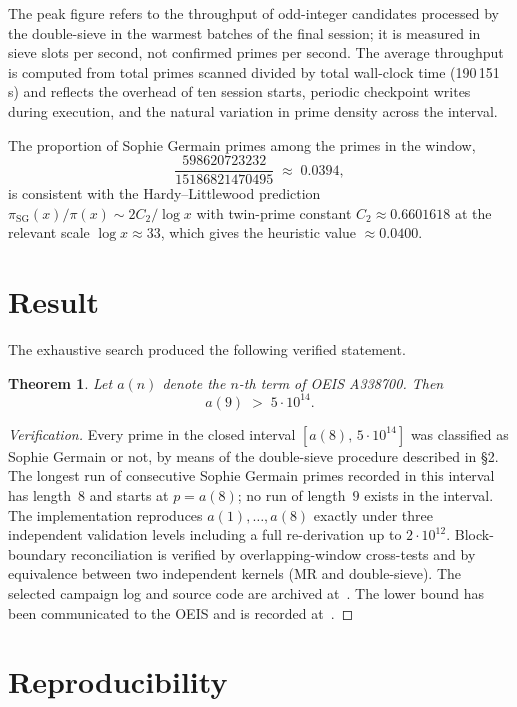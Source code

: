 \documentclass[11pt,a4paper]{article}
\newtheorem{theorem}{Theorem}
\theoremstyle{definition}
\begin{document}
The peak figure refers to the throughput of odd-integer candidates processed
by the double-sieve in the warmest batches of the final session; it is
measured in sieve slots per second, not confirmed primes per second. The
average throughput is computed from total primes scanned divided by total
wall-clock time (190\,151\,s) and reflects the overhead of ten session
starts, periodic checkpoint writes during execution, and the natural
variation in prime density across the interval.

The proportion of Sophie Germain primes among the primes in the window,
\[
  \frac{\num{598620723232}}{\num{15186821470495}}
  \;\approx\; 0.0394,
\]
is consistent with the Hardy--Littlewood prediction~\cite{hardy-littlewood}
$\pi_{\mathrm{SG}}(x)/\pi(x) \sim 2 C_2 / \log x$ with twin-prime
constant $C_2 \approx 0.6601618$ at the relevant scale
$\log x \approx 33$, which gives the heuristic value $\approx 0.0400$.

\section{Result}

The exhaustive search produced the following verified statement.

\begin{theorem}
Let $a(n)$ denote the $n$-th term of OEIS A338700. Then
\[
  a(9) \;>\; 5 \cdot 10^{14}.
\]
\end{theorem}

\begin{proof}[Verification]
Every prime in the closed interval $[a(8),\,5\cdot 10^{14}]$ was
classified as Sophie Germain or not, by means of the double-sieve
procedure described in §2. The longest run of consecutive Sophie
Germain primes recorded in this interval has length~$8$ and starts at
$p = a(8)$; no run of length~$9$ exists in the interval. The
implementation reproduces $a(1),\ldots,a(8)$ exactly under three
independent validation levels including a full re-derivation up to
$2\cdot 10^{12}$. Block-boundary reconciliation is verified by
overlapping-window cross-tests and by equivalence between two
independent kernels (MR and double-sieve). The selected campaign log and source code are archived at~\cite{repo}. The lower bound
has been communicated to the OEIS and is recorded at~\cite{corti-oeis}.
\end{proof}

\section{Reproducibility}
\end{document}
